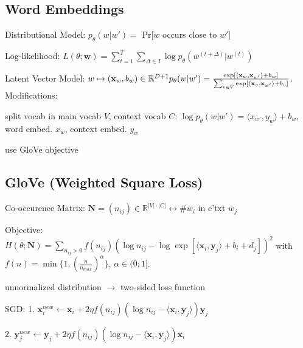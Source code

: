 \documentclass[a4paper, 11pt, landscape]{article}
\begin{document}
\begin{multicols*}{3}
\section{Word Embeddings}
\begin{compactdesc}
  \item[Distributional Model:] $p_\theta(w|w') = $ Pr[$w$ occurs close to $w'$]
  \item[Log-likelihood:] $L(\theta; \mathbf{w}) = \sum_{t=1}^T\sum_{\Delta \in I}{\log p_\theta(w^{(t+\Delta)}|w^{(t)})}$
  \item[Latent Vector Model:] $w \mapsto (\mathbf{x}_w, b_w) \in \mathbb{R}^{D+1} \\p_{\theta}(w|w') = \frac{\exp[\langle \mathbf{x}_w,\mathbf{x}_{w'}\rangle + b_w]}{\sum_{v\in V}{\exp[\langle \mathbf{x}_v,\mathbf{x}_{w'}\rangle + b_v ]}}$.
  Modifications:
  \begin{inparaitem}[\color{red}\textbullet]
  \item split vocab in main vocab $V$, context vocab $C$: $\log p_{\theta}(w|w') = \langle x_{w'}, y_{w} \rangle + b_w$, word embed. $x_w$, context embed. $y_w$
  \item use GloVe objective
  \end{inparaitem}
\end{compactdesc}

\subsection{GloVe (Weighted Square Loss)}
\begin{compactdesc}
  \item[Co-occurence Matrix:]$\mathbf{N} = (n_{ij}) \in \mathbb{R}^{|V|\cdot |C|} \leftrightarrow \# w_i$ in c'txt $w_j$
  \item[Objective:] $H(\theta;\mathbf{N}) = \sum_{n_{ij} > 0} f(n_{ij})(\log n_{ij} - \log \exp[\langle \mathbf{x}_i, \mathbf{y}_j \rangle + b_i + d_j])^2$ with $f(n) = \min\{1, (\frac{n}{n_{max}})^\alpha\}$, $\alpha \in (0;1]$.
\end{compactdesc}
unnormalized distribution $\rightarrow$ two-sided loss function
\begin{compactdesc}
  \item[SGD:] 1. $\mathbf{x}_i^{new} \leftarrow \mathbf{x}_i + 2\eta f(n_{ij})(\log n_{ij} - \langle \mathbf{x}_i, \mathbf{y}_j \rangle)\mathbf{y}_j$ 
  \item \hspace{26pt}2. $\mathbf{y}_j^{new} \leftarrow \mathbf{y}_j + 2\eta f(n_{ij})(\log n_{ij} - \langle \mathbf{x}_i, \mathbf{y}_j \rangle)\mathbf{x}_i$
\end{compactdesc}


\end{multicols*}
\end{document}
